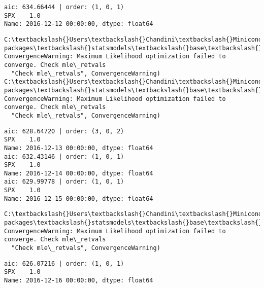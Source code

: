 \documentclass[11pt]{article}
\begin{document}
    \begin{Verbatim}[commandchars=\\\{\}]
aic: 634.66444 | order: (1, 0, 1)
SPX    1.0
Name: 2016-12-12 00:00:00, dtype: float64

    \end{Verbatim}

    \begin{Verbatim}[commandchars=\\\{\}]
C:\textbackslash{}Users\textbackslash{}Chandini\textbackslash{}Miniconda3\textbackslash{}envs\textbackslash{}auquan\textbackslash{}lib\textbackslash{}site-packages\textbackslash{}statsmodels\textbackslash{}base\textbackslash{}model.py:496: ConvergenceWarning: Maximum Likelihood optimization failed to converge. Check mle\_retvals
  "Check mle\_retvals", ConvergenceWarning)
C:\textbackslash{}Users\textbackslash{}Chandini\textbackslash{}Miniconda3\textbackslash{}envs\textbackslash{}auquan\textbackslash{}lib\textbackslash{}site-packages\textbackslash{}statsmodels\textbackslash{}base\textbackslash{}model.py:496: ConvergenceWarning: Maximum Likelihood optimization failed to converge. Check mle\_retvals
  "Check mle\_retvals", ConvergenceWarning)

    \end{Verbatim}

    \begin{Verbatim}[commandchars=\\\{\}]
aic: 628.64720 | order: (3, 0, 2)
SPX    1.0
Name: 2016-12-13 00:00:00, dtype: float64
aic: 632.43146 | order: (1, 0, 1)
SPX    1.0
Name: 2016-12-14 00:00:00, dtype: float64
aic: 629.99778 | order: (1, 0, 1)
SPX    1.0
Name: 2016-12-15 00:00:00, dtype: float64

    \end{Verbatim}

    \begin{Verbatim}[commandchars=\\\{\}]
C:\textbackslash{}Users\textbackslash{}Chandini\textbackslash{}Miniconda3\textbackslash{}envs\textbackslash{}auquan\textbackslash{}lib\textbackslash{}site-packages\textbackslash{}statsmodels\textbackslash{}base\textbackslash{}model.py:496: ConvergenceWarning: Maximum Likelihood optimization failed to converge. Check mle\_retvals
  "Check mle\_retvals", ConvergenceWarning)

    \end{Verbatim}

    \begin{Verbatim}[commandchars=\\\{\}]
aic: 626.07216 | order: (1, 0, 1)
SPX    1.0
Name: 2016-12-16 00:00:00, dtype: float64

    \end{Verbatim}
\end{document}
